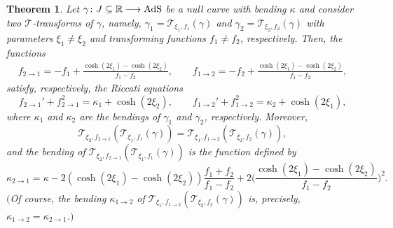 \documentclass[pdftex]{sigma}
\numberwithin{equation}{section}
\newtheorem{Theorem}{Theorem}[section]
\def\bending{\kappa}
\def\R{\mathbb{R}}
\def\AdS{{\rm AdS}}
\begin{document}
\begin{Theorem}\label{T3} Let $\gamma\colon J\subseteq\R\longrightarrow\AdS$ be a null curve with bending $\bending$ and consider two $\mathcal{T}$-transforms of $\gamma$, namely, $\gamma_1=\mathcal{T}_{\xi_1,f_1}(\gamma)$ and $\gamma_2=\mathcal{T}_{\xi_2,f_2}(\gamma)$ with parameters $\xi_1\neq\xi_2$ and transforming functions $f_1\neq f_2$, respectively. Then, the functions
	\begin{gather*}
		f_{2\to 1}=-f_1+\frac{\cosh(2\xi_1)-\cosh(2\xi_2)}{f_1-f_2},\qquad
		f_{1\to 2}=-f_2+\frac{\cosh(2\xi_1)-\cosh(2\xi_2)}{f_1-f_2},
	\end{gather*}
	satisfy, respectively, the Riccati equations
	\begin{equation*}
		f_{2\to 1}'+f_{2\to 1}^2=\bending_1+\cosh(2\xi_2),\qquad
		f_{1\to 2}'+f_{1\to 2}^2=\bending_2+\cosh(2\xi_1),
	\end{equation*}
	where $\bending_1$ and $\bending_2$ are the bendings of $\gamma_1$ and $\gamma_2$, respectively. Moreover,
	\begin{equation*}%
		\mathcal{T}_{\xi_2,f_{2\to 1}}(\mathcal{T}_{\xi_1,f_1}(\gamma))=\mathcal{T}_{\xi_1,f_{1\to 2}}(\mathcal{T}_{\xi_2,f_2}(\gamma)),
	\end{equation*}
	and the bending of $\mathcal{T}_{\xi_2,f_{2\to 1}}(\mathcal{T}_{\xi_1,f_1}(\gamma))$ is the function defined by
	\begin{equation*}%
		\bending_{2\to 1}=\bending-2(\cosh(2\xi_1)-\cosh(2\xi_2))\frac{f_1+f_2}{f_1-f_2}+2\biggl(\frac{\cosh(2\xi_1)-\cosh(2\xi_2)}{f_1-f_2}\biggr)^2.
	\end{equation*}
	$($Of course, the bending $\bending_{1\to 2}$ of $\mathcal{T}_{\xi_1,f_{1\to 2}}(\mathcal{T}_{\xi_2,f_2}(\gamma))$ is, precisely, $\bending_{1\to 2}=\bending_{2\to 1}$.$)$
\end{Theorem}
\end{document}
